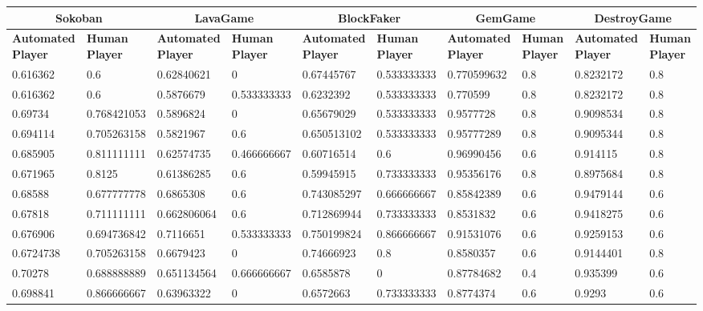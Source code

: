 \begin{landscape}
\begin{table}[!ht]
	\centering
	\begin{tabular}{|p{0.8in}|p{0.8in}|p{0.8in}|p{0.8in}|p{0.8in}|p{0.8in}|p{0.8in}|p{0.8in}|p{0.8in}|p{0.8in}|}
		\hline
		\multicolumn{2}{c}{\textbf{Sokoban}} & \multicolumn{2}{c}{\textbf{LavaGame}} & \multicolumn{2}{c}{\textbf{\textbf{BlockFaker}}} & \multicolumn{2}{c}{\textbf{GemGame}} & \multicolumn{2}{c}{\textbf{DestroyGame}}\\
		\hline
		\textbf{Automated Player} & \textbf{Human Player} & \textbf{Automated Player} & \textbf{Human Player} & \textbf{Automated Player} & \textbf{Human Player} & \textbf{Automated Player} & \textbf{Human Player} & \textbf{Automated Player} & \textbf{Human Player}\\
		\hline
		0.616362 & 0.6 & 0.62840621 & 0 & 0.67445767 & 0.533333333 & 0.770599632 & 0.8 & 0.8232172 & 0.8\\
		\hline
		0.616362 & 0.6 & 0.5876679 & 0.533333333 & 0.6232392 & 0.533333333 & 0.770599 & 0.8 & 0.8232172 & 0.8\\
		\hline
		0.69734 & 0.768421053 & 0.5896824 & 0 & 0.65679029 & 0.533333333 & 0.9577728 & 0.8 & 0.9098534 & 0.8\\
		\hline
		0.694114 & 0.705263158 & 0.5821967 & 0.6 & 0.650513102 & 0.533333333 & 0.95777289 & 0.8 & 0.9095344 & 0.8\\
		\hline
		0.685905 & 0.811111111 & 0.62574735 & 0.466666667 & 0.60716514 & 0.6 & 0.96990456 & 0.6 & 0.914115 & 0.8\\
		\hline
		0.671965 & 0.8125 & 0.61386285 & 0.6 & 0.59945915 & 0.733333333 & 0.95356176 & 0.8 & 0.8975684 & 0.8\\
		\hline
		0.68588 & 0.677777778 & 0.6865308 & 0.6 & 0.743085297 & 0.666666667 & 0.85842389 & 0.6 & 0.9479144 & 0.6\\
		\hline
		0.67818 & 0.711111111 & 0.662806064 & 0.6 & 0.712869944 & 0.733333333 & 0.8531832 & 0.6 & 0.9418275 & 0.6\\
		\hline
		0.676906 & 0.694736842 & 0.7116651 & 0.533333333 & 0.750199824 & 0.866666667 & 0.91531076 & 0.6 & 0.9259153 & 0.6\\
		\hline
		0.6724738 & 0.705263158 & 0.6679423 & 0 & 0.74666923 & 0.8 & 0.8580357 & 0.6 & 0.9144401 & 0.8\\
		\hline
		0.70278 & 0.688888889 & 0.651134564 & 0.666666667 & 0.6585878 & 0 & 0.87784682 & 0.4 & 0.935399 & 0.6\\
		\hline
		0.698841 & 0.866666667 & 0.63963322 & 0 & 0.6572663 & 0.733333333 & 0.8774374 & 0.6 & 0.9293 & 0.6\\

\end{tabular}
\end{table}
\end{landscape}

